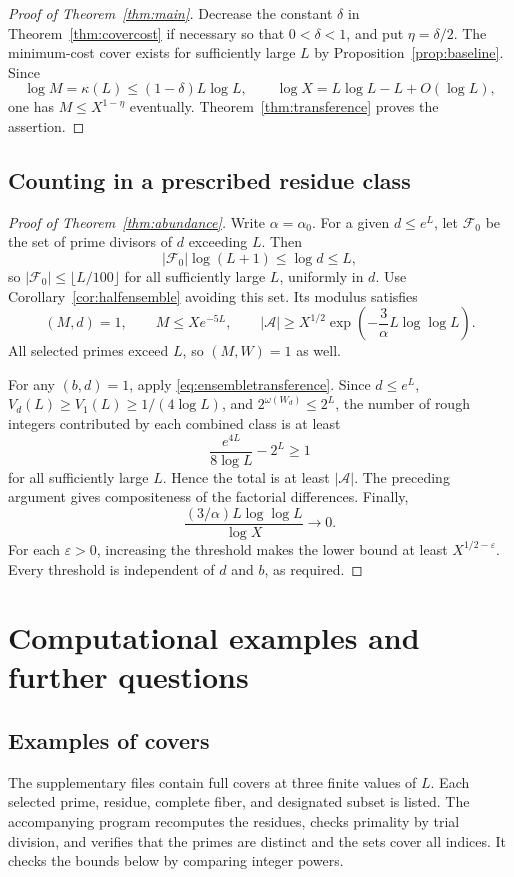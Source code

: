 \documentclass[11pt]{amsart}
\theoremstyle{definition}
\theoremstyle{remark}
\begin{document}
\begin{proof}[Proof of Theorem~\ref{thm:main}]
Decrease the constant $\delta$ in Theorem~\ref{thm:covercost} if
necessary so that $0<\delta<1$, and put $\eta=\delta/2$.
The minimum-cost cover exists for sufficiently large $L$ by
Proposition~\ref{prop:baseline}. Since
\[
\log M=\kappa(L)\leq(1-\delta)L\log L,
\qquad \log X=L\log L-L+O(\log L),
\]
one has $M\leq X^{1-\eta}$ eventually.
Theorem~\ref{thm:transference} proves the assertion.
\end{proof}

\subsection{Counting in a prescribed residue class}

\begin{proof}[Proof of Theorem~\ref{thm:abundance}]
Write $\alpha=\alpha_0$. For a given $d\leq e^L$, let $\mathcal F_0$
be the set of prime divisors of $d$ exceeding $L$. Then
\[
|\mathcal F_0|\log(L+1)\leq\log d\leq L,
\]
so $|\mathcal F_0|\leq\lfloor L/100\rfloor$ for all sufficiently large
$L$, uniformly in $d$. Use Corollary~\ref{cor:halfensemble} avoiding this
set. Its modulus satisfies
\[
(M,d)=1,\qquad M\leq Xe^{-5L},\qquad
|\mathcal A|\geq X^{1/2}
\exp\left(-\frac3\alpha L\log\log L\right).
\]
All selected primes exceed $L$, so $(M,W)=1$ as well.

For any $(b,d)=1$, apply \eqref{eq:ensembletransference}.
Since $d\leq e^L$, $V_d(L)\geq V_1(L)\geq1/(4\log L)$, and
$2^{\omega(W_d)}\leq2^L$, the number of rough integers contributed by
each combined class is at least
\[
\frac{e^{4L}}{8\log L}-2^L\geq1
\]
for all sufficiently large $L$. Hence the total is at least
$|\mathcal A|$. The preceding argument gives compositeness of the
factorial differences. Finally,
\[
\frac{(3/\alpha)L\log\log L}{\log X}\longrightarrow0.
\]
For each $\varepsilon>0$, increasing the threshold makes the lower
bound at least $X^{1/2-\varepsilon}$. Every threshold is independent of
$d$ and $b$, as required.
\end{proof}
\section{Computational examples and further questions}\label{sec:conclusion}

\subsection{Examples of covers}
The supplementary files contain full covers at three finite values of
$L$. Each selected prime, residue, complete fiber, and designated subset
is listed. The accompanying program recomputes the residues, checks
primality by trial division, and verifies that the primes are distinct
and the sets cover all indices. It checks the bounds below by comparing
integer powers.
\end{document}
